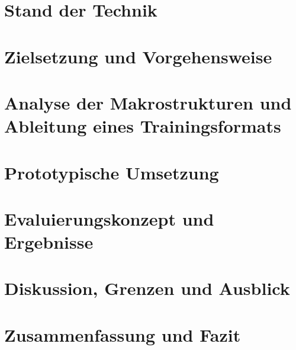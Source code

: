 \documentclass[12pt,a4paper%
              ,oneside     %
              ,titlepage
              ,DIV=13
              ,headinclude
              ,footinclude=false%
              ,cleardoublepage=empty%
              ,parskip=half,
              BCOR=0mm,
              ]{scrreprt}
\begin{document}
\chapter{Stand der Technik}

\chapter{Zielsetzung und Vorgehensweise}

\chapter{Analyse der Makrostrukturen und Ableitung eines Trainingsformats}

\chapter{Prototypische Umsetzung}

\chapter{Evaluierungskonzept und Ergebnisse}

\chapter{Diskussion, Grenzen und Ausblick}

\chapter{Zusammenfassung und Fazit}

\appendix

\AuthorDeclaration


\listoffigures %
\listoftables %

\renewcommand{\bibfont}{\footnotesize}
\printbibliography[title={Literaturverzeichnis}, 
                   heading=bibintoc]


{ %
\printindex
}
\end{document}
